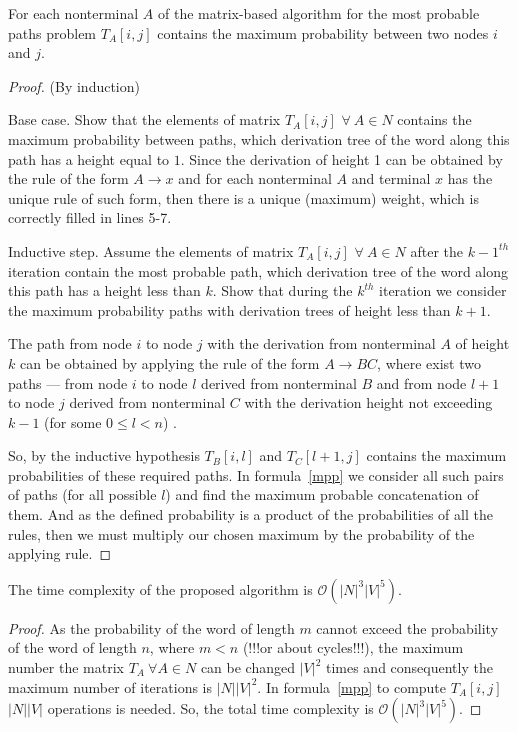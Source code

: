 \documentclass[sigconf, 10pt]{acmart}
\begin{document}
\begin{theorem}
For each nonterminal $A$ of the matrix-based algorithm for the most probable paths problem $T_A[i,j]$ contains the maximum probability between two nodes $i$ and $j$. 
\end{theorem}

\begin{proof} (By induction) 

Base case. Show that the elements of matrix $T_A[i, j]$ $\forall \ A \in N$ contains the maximum probability between paths, which derivation tree of the word along this path has a height equal to $1$. Since the derivation of height 1 can be obtained by the rule of the form $A \to x$ and for each nonterminal $A$ and terminal $x$ has the unique rule of such form, then there is a unique (maximum) weight, which is correctly filled in lines 5-7.


Inductive step. Assume the elements of matrix $T_A[i, j]$ $\forall \ A \in N$ after the $k-1^{th}$ iteration contain the most probable path, which derivation tree of the word along this path has a height less than $k$. Show that during the $k^{th}$ iteration we consider the maximum probability paths with derivation trees of height less than $k+1$. 

The path from node $i$ to node $j$ with the derivation from nonterminal $A$ of height $k$ can be obtained by applying the rule of the form $A \to BC$, where exist two paths --- from node $i$ to node $l$ derived from nonterminal $B$ and from node $l+1$ to node $j$ derived from nonterminal $C$ with the derivation height not exceeding $k-1$ (for some $0 \leq l < n$) .

So, by the inductive hypothesis $T_B[i, l]$ and $T_C[l+1, j]$ contains the maximum probabilities of these required paths. In formula~\ref{mpp} we consider all such pairs of paths (for all possible $l$) and find the maximum probable concatenation of them. And as the defined probability is a product of the probabilities of all the rules, then we must multiply our chosen maximum by the probability of the applying rule.

\end{proof}

\begin{theorem}
The time complexity of the proposed algorithm is $\mathcal{O}(|N|^3|V|^5)$. 
\end{theorem}

\begin{proof}
{\color{red}As the probability of the word of length $m$ cannot exceed the probability of the word of length $n$, where $m < n$ (!!!or about cycles!!!),} the maximum number the matrix $T_A \ \forall A \in N$ can be changed $|V|^2$ times and consequently the maximum number of iterations is $|N||V|^2$. In formula~\ref{mpp} to compute $T_A[i, j]$  $|N||V|$ operations is needed. So, the total time complexity is $\mathcal{O}(|N|^3|V|^5)$.
\end{proof}
\end{document}
